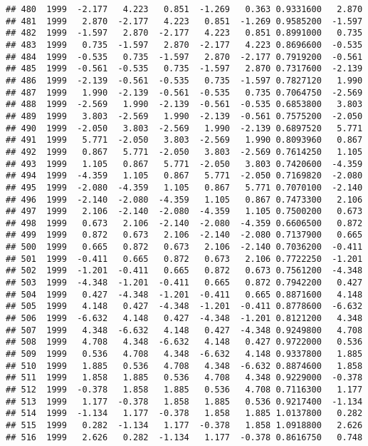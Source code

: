 \documentclass[]{article}
\begin{document}
\begin{verbatim}
## 480  1999  -2.177   4.223   0.851  -1.269   0.363 0.9331600   2.870
## 481  1999   2.870  -2.177   4.223   0.851  -1.269 0.9585200  -1.597
## 482  1999  -1.597   2.870  -2.177   4.223   0.851 0.8991000   0.735
## 483  1999   0.735  -1.597   2.870  -2.177   4.223 0.8696600  -0.535
## 484  1999  -0.535   0.735  -1.597   2.870  -2.177 0.7919200  -0.561
## 485  1999  -0.561  -0.535   0.735  -1.597   2.870 0.7317600  -2.139
## 486  1999  -2.139  -0.561  -0.535   0.735  -1.597 0.7827120   1.990
## 487  1999   1.990  -2.139  -0.561  -0.535   0.735 0.7064750  -2.569
## 488  1999  -2.569   1.990  -2.139  -0.561  -0.535 0.6853800   3.803
## 489  1999   3.803  -2.569   1.990  -2.139  -0.561 0.7575200  -2.050
## 490  1999  -2.050   3.803  -2.569   1.990  -2.139 0.6897520   5.771
## 491  1999   5.771  -2.050   3.803  -2.569   1.990 0.8093960   0.867
## 492  1999   0.867   5.771  -2.050   3.803  -2.569 0.7614250   1.105
## 493  1999   1.105   0.867   5.771  -2.050   3.803 0.7420600  -4.359
## 494  1999  -4.359   1.105   0.867   5.771  -2.050 0.7169820  -2.080
## 495  1999  -2.080  -4.359   1.105   0.867   5.771 0.7070100  -2.140
## 496  1999  -2.140  -2.080  -4.359   1.105   0.867 0.7473300   2.106
## 497  1999   2.106  -2.140  -2.080  -4.359   1.105 0.7500200   0.673
## 498  1999   0.673   2.106  -2.140  -2.080  -4.359 0.6606500   0.872
## 499  1999   0.872   0.673   2.106  -2.140  -2.080 0.7137900   0.665
## 500  1999   0.665   0.872   0.673   2.106  -2.140 0.7036200  -0.411
## 501  1999  -0.411   0.665   0.872   0.673   2.106 0.7722250  -1.201
## 502  1999  -1.201  -0.411   0.665   0.872   0.673 0.7561200  -4.348
## 503  1999  -4.348  -1.201  -0.411   0.665   0.872 0.7942200   0.427
## 504  1999   0.427  -4.348  -1.201  -0.411   0.665 0.8871600   4.148
## 505  1999   4.148   0.427  -4.348  -1.201  -0.411 0.8778600  -6.632
## 506  1999  -6.632   4.148   0.427  -4.348  -1.201 0.8121200   4.348
## 507  1999   4.348  -6.632   4.148   0.427  -4.348 0.9249800   4.708
## 508  1999   4.708   4.348  -6.632   4.148   0.427 0.9722000   0.536
## 509  1999   0.536   4.708   4.348  -6.632   4.148 0.9337800   1.885
## 510  1999   1.885   0.536   4.708   4.348  -6.632 0.8874600   1.858
## 511  1999   1.858   1.885   0.536   4.708   4.348 0.9229000  -0.378
## 512  1999  -0.378   1.858   1.885   0.536   4.708 0.7116300   1.177
## 513  1999   1.177  -0.378   1.858   1.885   0.536 0.9217400  -1.134
## 514  1999  -1.134   1.177  -0.378   1.858   1.885 1.0137800   0.282
## 515  1999   0.282  -1.134   1.177  -0.378   1.858 1.0918800   2.626
## 516  1999   2.626   0.282  -1.134   1.177  -0.378 0.8616750   0.748

\end{verbatim}
\end{document}
